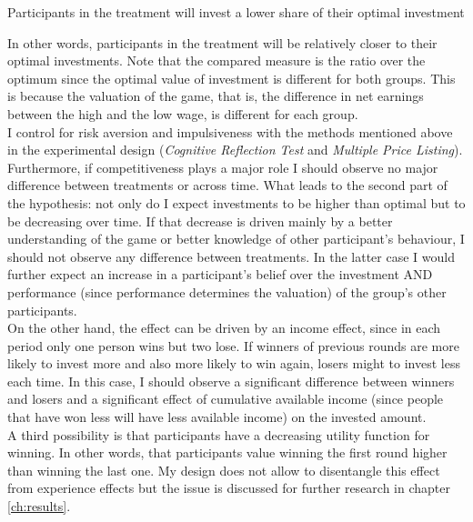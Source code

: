     \begin{hyp} \label{hyp:treat-overinvest}
    Participants in the treatment will invest a lower share of their optimal investment
    \end{hyp}
    
    In other words, participants in the treatment will be relatively closer to their optimal investments. Note that the compared measure is the ratio over the optimum since the optimal value of investment is different for both groups. This is because the valuation of the game, that is, the difference in net earnings between the high and the low wage, is different for each group.\\ 
    
    I control for risk aversion and impulsiveness with the methods mentioned above in the experimental design (\textit{Cognitive Reflection Test} and \textit{Multiple Price Listing}). Furthermore, if competitiveness plays a major role I should observe no major difference between treatments or across time. What leads to the second part of the hypothesis: not only do I expect investments to be higher than optimal but to be decreasing over time. If that decrease is driven mainly by a better understanding of the game or better knowledge of other participant's behaviour, I should not observe any difference between treatments. In the latter case I would further expect an increase in a participant's belief over the investment AND performance (since performance determines the valuation) of the group's other participants.\\
    
    On the other hand, the effect can be driven by an income effect, since in each period only one person wins but two lose. If winners of previous rounds are more likely to invest more and also more likely to win again, losers might to invest less each time.  In this case, I should observe a significant difference between winners and losers and a significant effect of cumulative available income (since people that have won less will have less available income) on the invested amount.\\
    
    A third possibility is that participants have a decreasing utility function for winning. In other words, that participants value winning the first round higher than winning the last one. My design does not allow to disentangle this effect from experience effects but the issue is discussed for further research in chapter \ref{ch:results}.\\
      
